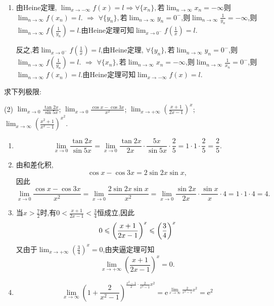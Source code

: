 \begin{solution}
\begin{enumerate}[(1)]
        \item 由Heine定理, $\lim_{x \to -\infty} f(x) = l \Rightarrow \forall \{x_n\}, $若$\lim_{n \to \infty} x_n = -\infty$则$\lim_{n \to \infty} f(x_n) = l$. $\Rightarrow$ $\forall \{ y_n \}, $若$\lim_{n \to \infty} y_n = 0^-$,则$\lim_{n \to \infty} \frac{1}{y_n} = -\infty$,则$\lim_{n \to \infty} f\left( \frac{1}{y_n} \right) = l$.由Heine定理可知$\lim_{x \to 0^-} f\left(\frac{1}{x}\right)=l$.

              反之,若$\lim_{x \to 0^-} f\left(\frac{1}{x}\right)=l$,由Heine定理, $\forall \{y_n\}, $若$\lim_{n \to \infty} y_n = 0^-$,则$\lim_{n \to \infty} f\left( \frac{1}{y_n} \right) = l$. $\Rightarrow$ $\forall \{x_n\}, $若$\lim_{n \to \infty} x_n = -\infty$,则$\lim_{n \to \infty} \frac{1}{x_n} = 0^-$,则$\lim_{n \to \infty} f(x_n) = l$.由Heine定理可知$\lim_{x \to -\infty} f(x) = l$.
    \end{enumerate}
\end{solution}

\begin{exercise}[1.3.9]
    求下列极限:
    \begin{tasks}[label=(\arabic*)](2)
        \task $\lim_{x \to 0} \frac{\tan 2x}{\sin 5x}$;
        \task $\lim_{x \to 0} \frac{\cos x - \cos 3x}{x^2}$;
        \task $\lim_{x \to +\infty} \left(\frac{x+1}{2x-1}\right)^x$;
        \task $\lim_{x \to \infty} \left(\frac{x^2+1}{x^2-1}\right)^{x^2}$.
    \end{tasks}
\end{exercise}

\begin{solution}
    \begin{enumerate}[(1)]
        \item $$\lim_{x \to 0} \frac{\tan 2x}{\sin 5x} = \lim_{x \to 0} \frac{\tan 2x}{2x} \cdot \frac{5x}{\sin 5x} \cdot \frac{2}{5} = 1 \cdot 1 \cdot \frac{2}{5} = \frac{2}{5}.$$
        \item 由和差化积, $$ \cos x - \cos 3x = 2 \sin 2x \sin x, $$因此$$\lim_{x \to 0} \frac{\cos x - \cos 3x}{x^2} = \lim_{x \to 0} \frac{2 \sin 2x \sin x}{x^2} = \lim_{x \to 0} \frac{\sin 2x}{2x} \cdot \frac{\sin x}{x} \cdot 4 = 1 \cdot 1 \cdot 4 = 4.$$
        \item 当$x>\frac{7}{2}$时,有$0<\frac{x+1}{2x-1}<\frac{3}{4}$恒成立,因此$$0\leqslant\left(\frac{x+1}{2x-1}\right)^x\leqslant\left(\frac{3}{4}\right)^x$$
              又由于$\lim_{x \to +\infty} \left(\frac{3}{4}\right)^x = 0$,由夹逼定理可知$$\lim_{x \to +\infty} \left(\frac{x+1}{2x-1}\right)^x = 0.$$
        \item $$
                  \lim_{x \to \infty} \left(1 + \frac{2}{x^2 - 1}\right)^{\frac{x^2 - 1}{2} \cdot \frac{2}{x^2 - 1} x^2} = \mathrm{e}^{\lim_{x \to \infty} \frac{2}{x^2 - 1} x^2} = \mathrm{e}^2
              $$
    \end{enumerate}
\end{solution}

